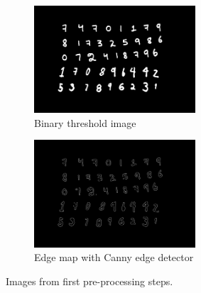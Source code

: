 \documentclass[12pt, letterpaper]{article}
\begin{document}
\begin{figure}[!h]
\begin{center}
\begin{subfigure}{0.47\textwidth}
\centering
\includegraphics*[width=0.95 \textwidth, height=4cm]{thresh.png}
\caption{Binary threshold image}
\end{subfigure}
\begin{subfigure}{0.47\textwidth}
\centering
\includegraphics*[width=0.95 \textwidth, height=4cm]{edge.png}
\caption{Edge map with Canny edge detector}
\end{subfigure}
\end{center}
\caption{Images from first pre-processing steps.}
\label{fig:first-pre}
\end{figure}
\end{document}
